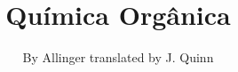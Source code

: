 \documentclass[a4paper,10pt,oneside,brazil]{book}
\begin{document}
\date{}
\title{Química Orgânica}
\author{By Allinger translated by J. Quinn}
\maketitle
\tableofcontents









\end{document}
